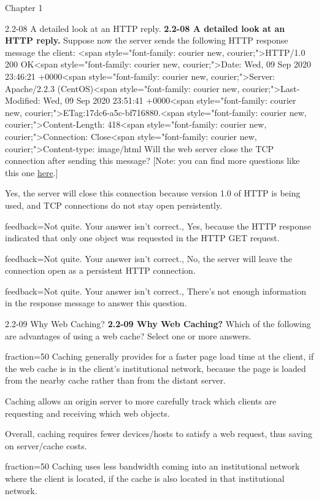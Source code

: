 \documentclass[a4paper]{article}
\begin{document}
\begin{quiz}{Chapter 1}
\begin{multi}[points=1,shuffle]{2.2-08 A detailed look at an HTTP reply.}
\textbf{2.2-08 A detailed look at an HTTP reply.} Suppose now the server sends the following HTTP response message the client: <span style="font-family: courier new, courier;">HTTP/1.0 200 OK<span style="font-family: courier new, courier;">Date: Wed, 09 Sep 2020 23:46:21 +0000<span style="font-family: courier new, courier;">Server: Apache/2.2.3 (CentOS)<span style="font-family: courier new, courier;">Last-Modified: Wed, 09 Sep 2020 23:51:41 +0000<span style="font-family: courier new, courier;">ETag:17dc6-a5c-bf716880.<span style="font-family: courier new, courier;">Content-Length: 418<span style="font-family: courier new, courier;">Connection: Close<span style="font-family: courier new, courier;">Content-type: image/html Will the web server close the TCP connection after sending this message? [Note: you can find more questions like this one \href{http://gaia.cs.umass.edu/kurose_ross/interactive/http-response.php}{here}.]
\item* Yes, the server will close this connection because version 1.0 of HTTP is being used, and TCP connections do not stay open persistently.
\item[feedback={Not quite.  Your answer isn't correct.},] Yes, because the HTTP response indicated that only one object was requested in the HTTP GET request.
\item[feedback={Not quite.  Your answer isn't correct.},] No, the server will leave the connection open as a persistent HTTP connection.
\item[feedback={Not quite.  Your answer isn't correct.},] There's not enough information in the response message to answer this question.
\end{multi}

\begin{multi}[points=1,shuffle,multiple]{2.2-09 Why Web Caching?}
\textbf{2.2-09 Why Web Caching?} Which of the following are advantages of using a web cache? Select one or more answers.
\item[fraction=50] Caching generally provides for a faster page load time at the client, if  the web cache is in the client’s institutional network, because the page is loaded from the nearby cache rather than from the distant server.
\item Caching allows an origin server to more carefully track which clients are requesting and receiving which web objects.
\item Overall, caching requires  fewer  devices/hosts to satisfy a web request, thus saving on server/cache costs.
\item[fraction=50] Caching uses less bandwidth coming into an institutional network where the client is located, if the cache is also located in that institutional network.
\end{multi}


\end{quiz}
\end{document}

